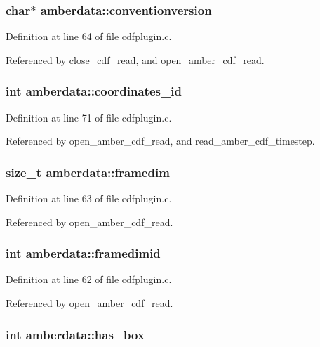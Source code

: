 \subsubsection{\setlength{\rightskip}{0pt plus 5cm}char$\ast$ amberdata::conventionversion}\label{structamberdata_m7}




Definition at line 64 of file cdfplugin.c.

Referenced by close\_\-cdf\_\-read, and open\_\-amber\_\-cdf\_\-read.
\subsubsection{\setlength{\rightskip}{0pt plus 5cm}int amberdata::coordinates\_\-id}\label{structamberdata_m14}




Definition at line 71 of file cdfplugin.c.

Referenced by open\_\-amber\_\-cdf\_\-read, and read\_\-amber\_\-cdf\_\-timestep.
\subsubsection{\setlength{\rightskip}{0pt plus 5cm}size\_\-t amberdata::framedim}\label{structamberdata_m6}




Definition at line 63 of file cdfplugin.c.

Referenced by open\_\-amber\_\-cdf\_\-read.
\subsubsection{\setlength{\rightskip}{0pt plus 5cm}int amberdata::framedimid}\label{structamberdata_m5}




Definition at line 62 of file cdfplugin.c.

Referenced by open\_\-amber\_\-cdf\_\-read.
\subsubsection{\setlength{\rightskip}{0pt plus 5cm}int amberdata::has\_\-box}\label{structamberdata_m0}




